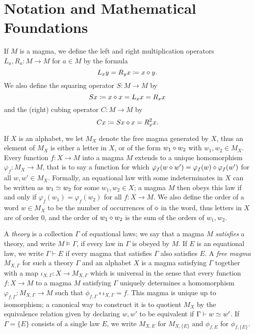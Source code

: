 \section{Notation and Mathematical Foundations}\label{notation-sec}

If $M$ is a magma, we define the left and right multiplication operators $L_a, R_a \colon M \to M$ for $a \in M$ by the formula
\begin{equation}\label{left-right}
    L_x y = R_y x \coloneqq x \diamond y.
\end{equation}
We also define the squaring operator $S \colon M \to M$ by
\begin{equation}\label{square-def}
    Sx \coloneqq x \diamond x = L_x x = R_x x
\end{equation}
and the (right) cubing operator $C \colon M \to M$ by
\begin{equation}\label{cube-def}
    Cx \coloneqq Sx \diamond x = R_x^2 x.
\end{equation}

If $X$ is an alphabet, we let $M_X$ denote the free magma generated by $X$, thus an element of $M_X$ is either a letter in $X$, or of the form $w_1 \diamond w_2$ with $w_1,w_2 \in M_X$.  Every function $f \colon X \to M$ into a magma $M$ extends to a unique homomorphism $\varphi_f \colon M_X \to M$, that is to say a function for which $\varphi_f(w \diamond w') = \varphi_f(w) \diamond \varphi_f(w')$ for all $w,w' \in M_X$.  Formally, an equational law with some indeterminates in $X$ can be written as $w_1 \simeq w_2$ for some $w_1, w_2 \in X$; a magma $M$ then obeys this law if and only if $\varphi_f(w_1) = \varphi_f(w_2)$ for all $f \colon X \to M$.  We also define the order of a word $w \in M_X$ to be the number of occurrences of $\diamond$ in the word, thus letters in $X$ are of order $0$, and the order of $w_1 \diamond w_2$ is the sum of the orders of $w_1, w_2$.

A \emph{theory} is a collection $\Gamma$ of equational laws; we say that a magma $M$ \emph{satisfies} a theory, and write $M \models \Gamma$, if every law in $\Gamma$ is obeyed by $M$.  If $E$ is an equational law, we write $\Gamma \vdash E$ if every magma that satisfies $\Gamma$ also satisfies $E$. A \emph{free magma} $M_{X,\Gamma}$ for such a theory $\Gamma$ and an alphabet $X$ is a magma satisfying $\Gamma$ together with a map $\iota_{X,\Gamma} \colon X \to M_{X,\Gamma}$ which is universal in the sense that every function $f \colon X \to M$ to a magma $M$ satisfying $\Gamma$ uniquely determines a homomorphism $\varphi_{f,\Gamma} \colon M_{X,\Gamma} \to M$ such that $\phi_{f,\Gamma} \circ \iota_{X,\Gamma} = f$.  This magma is unique up to isomorphism; a canonical way to construct it is to quotient $M_X$ by the equivalence relation given by declaring $w,w'$ to be equivalent if $\Gamma \vdash w \simeq w'$.  If $\Gamma = \{E\}$ consists of a single law $E$, we write $M_{X,E}$ for $M_{X,\{E\}}$ and $\phi_{f,E}$ for $\phi_{f,\{E\}}$. 

